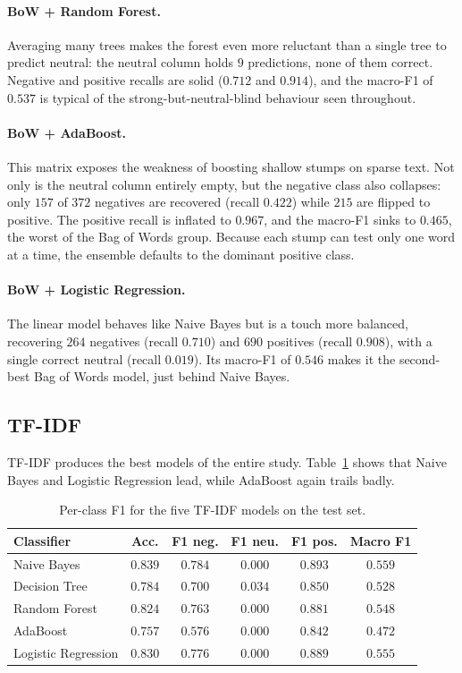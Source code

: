 \documentclass[11pt,a4paper]{article}
\begin{document}
\paragraph{BoW + Random Forest.} Averaging many trees makes the forest even more reluctant
than a single tree to predict neutral: the neutral column holds $9$ predictions, none of
them correct. Negative and positive recalls are solid ($0.712$ and $0.914$), and the
macro-F1 of $0.537$ is typical of the strong-but-neutral-blind behaviour seen throughout.

\paragraph{BoW + AdaBoost.} This matrix exposes the weakness of boosting shallow stumps on
sparse text. Not only is the neutral column entirely empty, but the negative class also
collapses: only $157$ of $372$ negatives are recovered (recall $0.422$) while $215$ are
flipped to positive. The positive recall is inflated to $0.967$, and the macro-F1 sinks to
$0.465$, the worst of the Bag of Words group. Because each stump can test only one word at
a time, the ensemble defaults to the dominant positive class.

\paragraph{BoW + Logistic Regression.} The linear model behaves like Naive Bayes but is a
touch more balanced, recovering $264$ negatives (recall $0.710$) and $690$ positives (recall
$0.908$), with a single correct neutral (recall $0.019$). Its macro-F1 of $0.546$ makes it
the second-best Bag of Words model, just behind Naive Bayes.

\subsection{TF-IDF}
TF-IDF produces the best models of the entire study. Table~\ref{tab:tfidf} shows that
Naive Bayes and Logistic Regression lead, while AdaBoost again trails badly.

\begin{table}[H]
\centering
\begin{tabular}{lccccc}
\toprule
\textbf{Classifier} & \textbf{Acc.} & \textbf{F1 neg.} & \textbf{F1 neu.} & \textbf{F1 pos.} & \textbf{Macro F1} \\
\midrule
Naive Bayes & $0.839$ & $0.784$ & $0.000$ & $0.893$ & $\mathbf{0.559}$ \\
Decision Tree & $0.784$ & $0.700$ & $0.034$ & $0.850$ & $0.528$ \\
Random Forest & $0.824$ & $0.763$ & $0.000$ & $0.881$ & $0.548$ \\
AdaBoost & $0.757$ & $0.576$ & $0.000$ & $0.842$ & $0.472$ \\
Logistic Regression & $0.830$ & $0.776$ & $0.000$ & $0.889$ & $0.555$ \\
\bottomrule
\end{tabular}
\caption{Per-class F1 for the five TF-IDF models on the test set.}
\label{tab:tfidf}
\end{table}
\end{document}
